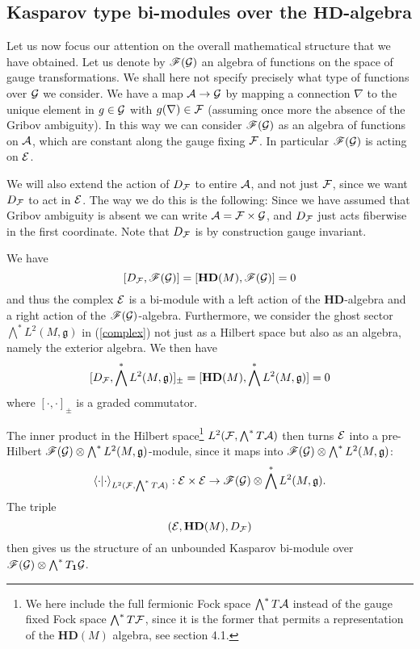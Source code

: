 \documentclass[letterpaper,11pt]{article}
\def\ca{{\cal A}}
\def\ce{{\cal E}}
\def\cf{{\cal F}}
\def\cg{{\cal G}}
\newcommand{\cF}{{\cal F}}
\begin{document}
\subsection{Kasparov type bi-modules over the $\mathbf{HD}$-algebra}

Let us now focus our attention on the overall mathematical structure that we have obtained. Let us denote by 
$
 \mathscr{F} (\cg)  
$
an algebra of functions on the space of gauge transformations. We shall here not specify precisely what type of functions over $\cg$ we consider.   We have a map  $\ca \to \cg$ by mapping a connection $\nabla$ to the unique element in $g\in \cg$ with $g(\nabla ) \in \cF$ (assuming once more the absence of the Gribov ambiguity).  In this way we can consider $ \mathscr{F} (\cg)$ as an algebra of functions on $\ca$, which are constant along the gauge fixing $\cF$. In particular $ \mathscr{F} (\cg)$ is acting on $\ce$.

We will also extend the action of $D_{\cF}$ to entire $\ca$, and not just $\cf$, since we want $D_\cf$ to act in $\ce$. The way we do this is the following: Since we have assumed that Gribov ambiguity is absent we can write $\ca = \cf \times \cg$, and $D_\cf$  just acts fiberwise in the first coordinate. Note that $D_\cf$ is by construction gauge invariant. 


We have
$$
[D_\cf, \mathscr{F} (\cg)]=[\mathbf{HD}(M),\mathscr{F} (\cg)]=0
$$
and thus the complex $\ce$ is a bi-module with a left action of the $\mathbf{HD}$-algebra and a right action of the  $\mathscr{F} (\cg)$-algebra. 
Furthermore, we consider the ghost sector  $\displaystyle{\bigwedge^* L^2(M,\mathfrak{g})}$ in (\ref{complex}) not just as a Hilbert space but also as an algebra, namely the exterior algebra. 
We then have
$$
[D_\cf, \bigwedge^* L^2(M,\mathfrak{g})]_\pm=[\mathbf{HD}(M),\bigwedge^* L^2(M,\mathfrak{g})]=0
$$
where $[\cdot,\cdot]_\pm$ is a graded commutator. 

The inner product in the Hilbert space\footnote{We here include the full fermionic Fock space $\bigwedge^* T\ca$ instead of the gauge fixed Fock space $\bigwedge^* T\cf$, since it is the former that permits a representation of the $\mathbf{HD}(M)$ algebra, see section 4.1. } $L^2(\cf,\bigwedge^* T\ca)$ then turns $\ce$ into a pre-Hilbert $\mathscr{F} (\cg)\otimes \bigwedge^* L^2(M,\mathfrak{g})$-module, since it maps into $\mathscr{F} (\cg)\otimes \bigwedge^* L^2(M,\mathfrak{g})$:
$$
\langle \cdot \vert \cdot \rangle_{L^2(\cf,\bigwedge^* T\ca)} :\ce \times \ce \rightarrow \mathscr{F} (\cg)\otimes \bigwedge^* L^2(M,\mathfrak{g}).
$$
The triple 
$$
(\ce,\mathbf{HD}(M), D_\cf)
$$
then gives us the structure of an unbounded Kasparov bi-module \cite{Kasparov} over $\mathscr{F} (\cg)\otimes \bigwedge^* T_\mathbf{1}\cg$. 
\end{document}
